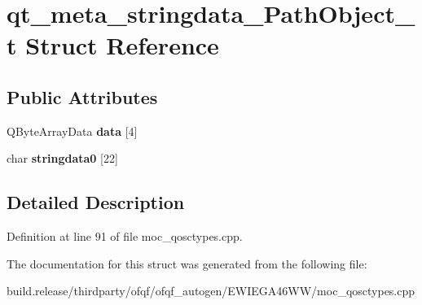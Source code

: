 \hypertarget{structqt__meta__stringdata___path_object__t}{}\section{qt\+\_\+meta\+\_\+stringdata\+\_\+\+Path\+Object\+\_\+t Struct Reference}
\label{structqt__meta__stringdata___path_object__t}
\subsection*{Public Attributes}
\begin{DoxyCompactItemize}
\item 
\mbox{\label{structqt__meta__stringdata___path_object__t_a5f364b18fbd1f3160fbc49ea9938f496}} 
Q\+Byte\+Array\+Data {\bfseries data} \mbox{[}4\mbox{]}
\item 
\mbox{\label{structqt__meta__stringdata___path_object__t_a8f083f7fdd1c96f5a3859d7c4ee9f5b2}} 
char {\bfseries stringdata0} \mbox{[}22\mbox{]}
\end{DoxyCompactItemize}


\subsection{Detailed Description}


Definition at line 91 of file moc\+\_\+qosctypes.\+cpp.



The documentation for this struct was generated from the following file\+:\begin{DoxyCompactItemize}
\item 
build.\+release/thirdparty/ofqf/ofqf\+\_\+autogen/\+E\+W\+I\+E\+G\+A46\+W\+W/moc\+\_\+qosctypes.\+cpp\end{DoxyCompactItemize}
